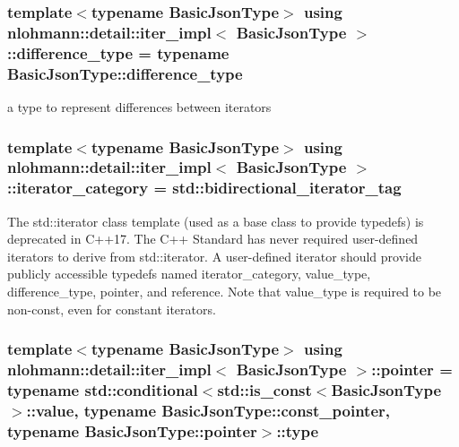 \subsubsection[{\texorpdfstring{difference\+\_\+type}{difference_type}}]{\setlength{\rightskip}{0pt plus 5cm}template$<$typename Basic\+Json\+Type$>$ using {\bf nlohmann\+::detail\+::iter\+\_\+impl}$<$ Basic\+Json\+Type $>$\+::{\bf difference\+\_\+type} =  typename Basic\+Json\+Type\+::difference\+\_\+type}\hypertarget{classnlohmann_1_1detail_1_1iter__impl_a2f7ea9f7022850809c60fc3263775840}{}\label{classnlohmann_1_1detail_1_1iter__impl_a2f7ea9f7022850809c60fc3263775840}


a type to represent differences between iterators 

\subsubsection[{\texorpdfstring{iterator\+\_\+category}{iterator_category}}]{\setlength{\rightskip}{0pt plus 5cm}template$<$typename Basic\+Json\+Type$>$ using {\bf nlohmann\+::detail\+::iter\+\_\+impl}$<$ Basic\+Json\+Type $>$\+::{\bf iterator\+\_\+category} =  std\+::bidirectional\+\_\+iterator\+\_\+tag}\hypertarget{classnlohmann_1_1detail_1_1iter__impl_ad9e091f5c70b34b5b1abc1ab15fd9106}{}\label{classnlohmann_1_1detail_1_1iter__impl_ad9e091f5c70b34b5b1abc1ab15fd9106}
The std\+::iterator class template (used as a base class to provide typedefs) is deprecated in C++17. The C++ Standard has never required user-\/defined iterators to derive from std\+::iterator. A user-\/defined iterator should provide publicly accessible typedefs named iterator\+\_\+category, value\+\_\+type, difference\+\_\+type, pointer, and reference. Note that value\+\_\+type is required to be non-\/const, even for constant iterators. 
\subsubsection[{\texorpdfstring{pointer}{pointer}}]{\setlength{\rightskip}{0pt plus 5cm}template$<$typename Basic\+Json\+Type$>$ using {\bf nlohmann\+::detail\+::iter\+\_\+impl}$<$ Basic\+Json\+Type $>$\+::{\bf pointer} =  typename std\+::conditional$<$std\+::is\+\_\+const$<$Basic\+Json\+Type$>$\+::{\bf value}, typename Basic\+Json\+Type\+::const\+\_\+pointer, typename Basic\+Json\+Type\+::pointer$>$\+::type}\hypertarget{classnlohmann_1_1detail_1_1iter__impl_a69e52f890ce8c556fd68ce109e24b360}{}\label{classnlohmann_1_1detail_1_1iter__impl_a69e52f890ce8c556fd68ce109e24b360}


